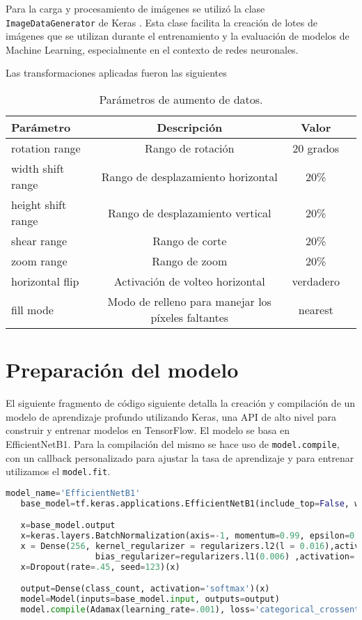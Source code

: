 Para la carga y procesamiento de imágenes se utilizó la clase \texttt{ImageDataGenerator} de Keras . Esta clase facilita la creación de lotes de imágenes que se utilizan durante el entrenamiento y la evaluación de modelos de Machine Learning, especialmente en el contexto de redes neuronales. 

Las transformaciones aplicadas fueron las siguientes

\begin{table}[ht]
   \centering
   \begin{tabular}{lccc}
   \hline
   Parámetro & Descripción  & Valor \\ \hline
   rotation range & 	Rango de rotación & 20 grados \\
   width shift range & Rango de desplazamiento horizontal & 20\% \\
   height shift range & Rango de desplazamiento vertical & 20\% \\
   shear range & 	Rango de corte & 20\% \\
   zoom range & Rango de zoom & 20\% \\
   horizontal flip & Activación de volteo horizontal & verdadero \\
   fill mode & Modo de relleno para manejar los píxeles faltantes & nearest \\ \hline
   \end{tabular}
   \caption{Parámetros de aumento de datos.}
   \label{tab:data_augmentation_params}
   \end{table}
     

\section*{Preparación del modelo}

El siguiente fragmento de código siguiente detalla la creación y compilación de un modelo de aprendizaje profundo utilizando Keras, una API de alto nivel para construir y entrenar modelos en TensorFlow. El modelo se basa en EfficientNetB1. Para la compilación del mismo se hace uso de \texttt{model.compile}, con un callback personalizado para ajustar la tasa de aprendizaje y para entrenar utilizamos el \texttt{model.fit}.

\begin{lstlisting}[language=Python]
   model_name='EfficientNetB1'
   base_model=tf.keras.applications.EfficientNetB1(include_top=False, weights="imagenet",input_shape=img_shape, pooling='max')

   x=base_model.output
   x=keras.layers.BatchNormalization(axis=-1, momentum=0.99, epsilon=0.001 )(x)
   x = Dense(256, kernel_regularizer = regularizers.l2(l = 0.016),activity_regularizer=regularizers.l1(0.006),
                  bias_regularizer=regularizers.l1(0.006) ,activation='relu')(x)
   x=Dropout(rate=.45, seed=123)(x)

   output=Dense(class_count, activation='softmax')(x)
   model=Model(inputs=base_model.input, outputs=output)
   model.compile(Adamax(learning_rate=.001), loss='categorical_crossentropy', metrics=['accuracy'])
\end{lstlisting}

